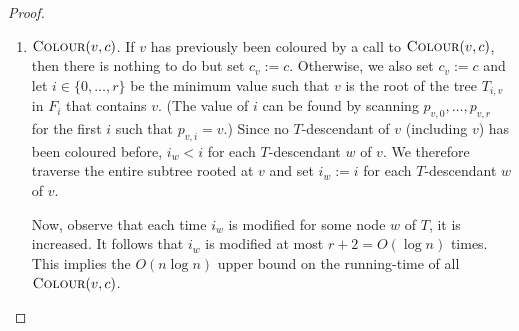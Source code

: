 \documentclass[kpfonts]{patmorin}
\begin{document}
\begin{proof}
\begin{enumerate}
     \item $\textsc{Colour}(v,c)$. If $v$ has previously been coloured by a call to $\textsc{Colour}(v,c)$, then there is nothing to do but set $c_v:=c$.  Otherwise, we also set $c_v:=c$ and let $i\in\{0,\ldots,r\}$ be the minimum value such that $v$ is the root of the tree $T_{i,v}$ in $F_i$ that contains $v$.  (The value of $i$ can be found by scanning $p_{v,0},\ldots,p_{v,r}$ for the first $i$ such that $p_{v,i}=v$.)   Since no $T$-descendant of $v$ (including $v$) has been coloured before, $i_w < i$ for each $T$-descendant $w$ of $v$.  We therefore traverse the entire subtree rooted at $v$ and set $i_w:=i$ for each $T$-descendant $w$ of $v$.

     Now, observe that each time $i_w$ is modified for some node $w$ of $T$, it is increased.  It follows that $i_w$ is modified at most $r+2=O(\log n)$ times.  This implies the $O(n\log n)$ upper bound on the running-time of all $\textsc{Colour}(v,c)$. \qedhere
   \end{enumerate}
 \end{proof}
\end{document}
